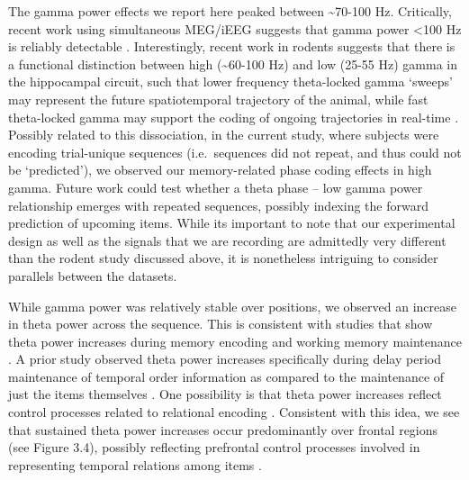 The gamma power effects we report here peaked between
\textasciitilde{}70-100 Hz. Critically, recent work using simultaneous
MEG/iEEG suggests that gamma power \textless{}100 Hz is reliably
detectable \autocite{dalal_simultaneous_2013}. Interestingly, recent
work in rodents suggests that there is a functional distinction between
high (\textasciitilde{}60-100 Hz) and low (25-55 Hz) gamma in the
hippocampal circuit, such that lower frequency theta-locked gamma
`sweeps' may represent the future spatiotemporal trajectory of the
animal, while fast theta-locked gamma may support the coding of ongoing
trajectories in real-time \autocite{zheng_spatial_2016}. Possibly
related to this dissociation, in the current study, where subjects were
encoding trial-unique sequences (i.e.~sequences did not repeat, and thus
could not be `predicted'), we observed our memory-related phase coding
effects in high gamma. Future work could test whether a theta phase --
low gamma power relationship emerges with repeated sequences, possibly
indexing the forward prediction of upcoming items. While its important
to note that our experimental design as well as the signals that we are
recording are admittedly very different than the rodent study discussed
above, it is nonetheless intriguing to consider parallels between the
datasets.

While gamma power was relatively stable over positions, we observed an
increase in theta power across the sequence. This is consistent with
studies that show theta power increases during memory encoding
\autocites{summerfield_coherent_2005}{sederberg_theta_2003} and working
memory maintenance
\autocites{hsieh_neural_2011}{gevins_high-resolution_1997}{raghavachari_gating_2001}{scheeringa_trial-by-trial_2009}.
A prior study observed theta power increases specifically during delay
period maintenance of temporal order information as compared to the
maintenance of just the items themselves \autocite{hsieh_neural_2011}.
One possibility is that theta power increases reflect control processes
related to relational encoding
\autocites{hsieh_neural_2011}{summerfield_coherent_2005}. Consistent
with this idea, we see that sustained theta power increases occur
predominantly over frontal regions (see Figure 3.4), possibly reflecting
prefrontal control processes involved in representing temporal relations
among items \autocite{blumenfeld_putting_2011}.

